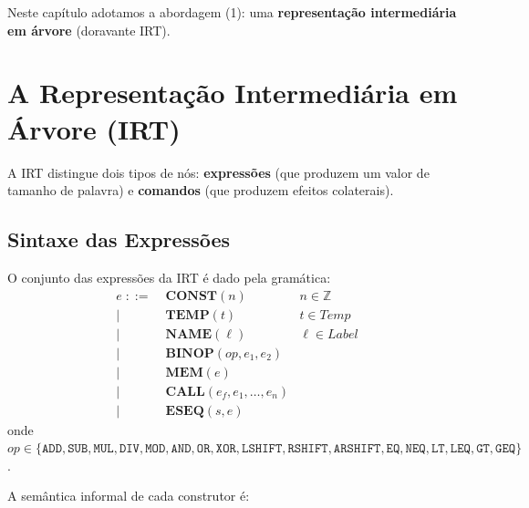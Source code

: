 Neste capítulo adotamos a abordagem (1): uma \textbf{representação
intermediária em árvore} (doravante IRT).

\section{A Representação Intermediária em Árvore (IRT)}\label{sec:irt}

A IRT distingue dois tipos de nós: \textbf{expressões} (que produzem um valor
de tamanho de palavra) e \textbf{comandos} (que produzem efeitos colaterais).

\subsection{Sintaxe das Expressões}\label{sec:irt-expr}

\begin{Definition}\label{def:irt-expr}
  O conjunto das expressões da IRT é dado pela gramática:
  \begin{align*}
    e \;::=\; & \mathbf{CONST}(n)                       & n \in \mathbb{Z} \\
    \mid\; & \mathbf{TEMP}(t)                    & t \in \mathit{Temp} \\
    \mid\; & \mathbf{NAME}(\ell)                 & \ell \in \mathit{Label} \\
    \mid\; & \mathbf{BINOP}(\mathit{op}, e_1, e_2) \\
    \mid\; & \mathbf{MEM}(e)                     \\
    \mid\; & \mathbf{CALL}(e_f, e_1, \ldots, e_n) \\
    \mid\; & \mathbf{ESEQ}(s, e)
  \end{align*}
  onde $\mathit{op} \in \{
    \mathtt{ADD}, \mathtt{SUB}, \mathtt{MUL}, \mathtt{DIV}, \mathtt{MOD},
    \mathtt{AND}, \mathtt{OR},  \mathtt{XOR},
    \mathtt{LSHIFT}, \mathtt{RSHIFT}, \mathtt{ARSHIFT},
    \mathtt{EQ},  \mathtt{NEQ},
    \mathtt{LT},  \mathtt{LEQ}, \mathtt{GT},  \mathtt{GEQ}
  \}$.
\end{Definition}

A semântica informal de cada construtor é:

